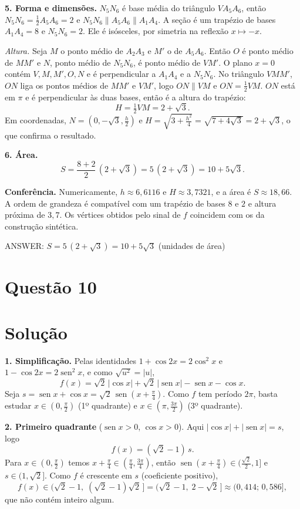 \documentclass{article}%
\begin{document}
\textbf{5. Forma e dimensões.} $N_5N_6$ é base média do triângulo $VA_5A_6$, então $N_5N_6=\tfrac12 A_5A_6=2$ e $N_5N_6\parallel A_5A_6\parallel A_1A_4$. A seção é um trapézio de bases $A_1A_4=8$ e $N_5N_6=2$. Ele é isósceles, por simetria na reflexão $x\mapsto -x$.

\emph{Altura.} Seja $M$ o ponto médio de $A_2A_3$ e $M'$ o de $A_5A_6$. Então $O$ é ponto médio de $MM'$ e $N$, ponto médio de $N_5N_6$, é ponto médio de $VM'$. O plano $x=0$ contém $V,M,M',O,N$ e é perpendicular a $A_1A_4$ e a $N_5N_6$. No triângulo $VMM'$, $ON$ liga os pontos médios de $MM'$ e $VM'$, logo $ON\parallel VM$ e $ON=\tfrac12 VM$. $ON$ está em $\pi$ e é perpendicular às duas bases, então é a altura do trapézio:
\[
H=\tfrac12 VM=2+\sqrt3 .
\]
Em coordenadas, $N=(0,-\sqrt3,\tfrac h2)$ e $H=\sqrt{3+\tfrac{h^2}{4}}=\sqrt{7+4\sqrt3}=2+\sqrt3$, o que confirma o resultado.

\textbf{6. Área.}
\[
S=\frac{8+2}{2}\,(2+\sqrt3)=5\,(2+\sqrt3)=10+5\sqrt3 .
\]

\textbf{Conferência.} Numericamente, $h\approx 6{,}6116$ e $H\approx 3{,}7321$, e a área é $S\approx 18{,}66$. A ordem de grandeza é compatível com um trapézio de bases $8$ e $2$ e altura próxima de $3{,}7$. Os vértices obtidos pelo sinal de $f$ coincidem com os da construção sintética.

ANSWER: $S = 5\,(2+\sqrt{3}) = 10+5\sqrt{3}$ (unidades de área)%
\newpage%
\section*{Questão 10}

\section*{Solução}

\textbf{1. Simplificação.} Pelas identidades $1+\cos 2x = 2\cos^2 x$ e $1-\cos 2x = 2\operatorname{sen}^2 x$, e como $\sqrt{u^2}=|u|$,
\[
f(x)=\sqrt{2}\,|\cos x|+\sqrt{2}\,|\operatorname{sen} x|-\operatorname{sen} x-\cos x .
\]
Seja $s=\operatorname{sen}x+\cos x=\sqrt2\,\operatorname{sen}\!\left(x+\tfrac{\pi}{4}\right)$. Como $f$ tem período $2\pi$, basta estudar $x\in(0,\tfrac{\pi}{2})$ (1º quadrante) e $x\in(\pi,\tfrac{3\pi}{2})$ (3º quadrante).

\textbf{2. Primeiro quadrante} ($\operatorname{sen}x>0$, $\cos x>0$). Aqui $|\cos x|+|\operatorname{sen} x| = s$, logo
\[
f(x)=(\sqrt2-1)\,s .
\]
Para $x\in(0,\tfrac{\pi}{2})$ temos $x+\tfrac{\pi}{4}\in(\tfrac{\pi}{4},\tfrac{3\pi}{4})$, então $\operatorname{sen}(x+\tfrac{\pi}{4})\in(\tfrac{\sqrt2}{2},1]$ e $s\in(1,\sqrt2]$. Como $f$ é crescente em $s$ (coeficiente positivo),
\[
f(x)\in\big(\sqrt2-1,\;(\sqrt2-1)\sqrt2\,\big]=\big(\sqrt2-1,\;2-\sqrt2\,\big]\approx(0{,}414;\,0{,}586],
\]
que não contém inteiro algum.
\end{document}
